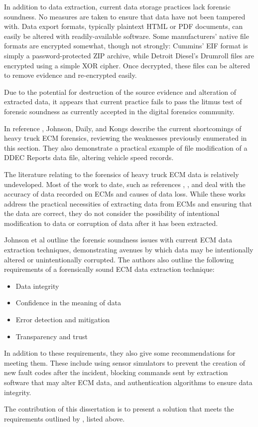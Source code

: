 In addition to data extraction, current data storage practices lack forensic soundness. No measures are taken to ensure that data have not been tampered
with. Data export formats, typically plaintext HTML or PDF documents, can easily be altered with readily-available software. Some manufacturers' native file formats are encrypted
somewhat, though not strongly: Cummins' EIF format is simply a password-protected ZIP archive, while Detroit Diesel's Drumroll files are encrypted using a simple XOR cipher.
Once decrypted, these files can be altered to remove evidence and re-encrypted easily\cite{Johnson2014}.

Due to the potential for destruction of the source evidence and alteration of extracted data, it appears that current practice fails to pass the litmus test of forensic soundness
as currently accepted in the digital forensics community.

In reference \cite{Johnson2014}, Johnson, Daily, and Kongs describe the current shortcomings of heavy truck ECM forensics, reviewing the weaknesses previously enumerated in this section. They also
demonstrate a practical example of file modification of a DDEC Reports data file, altering vehicle speed records.


The literature relating to the forensics of heavy truck ECM data is relatively undeveloped. Most of the work to date, such as references \cite{reust2004}, \cite{steiner2013}, and \cite{austin2011} deal
with the accuracy of data recorded on ECMs and causes of data loss. While these works address the practical necessities of extracting data from ECMs and ensuring that the data are
correct, they do not consider the possibility of intentional modification to data or corruption of data after it has been extracted.

Johnson et al \cite{Johnson2014} outline the forensic soundness issues with current ECM data extraction techniques, demonstrating avenues by which data may be intentionally altered or unintentionally corrupted. The authors also outline the following requirements of a forensically sound ECM data extraction technique:

\begin{itemize}
  \item Data integrity
  \item Confidence in the meaning of data
  \item Error detection and mitigation
  \item Transparency and trust
\end{itemize}

In addition to these requirements, they also give some recommendations for meeting them. These include using sensor simulators to prevent the creation of new fault codes
after the incident, blocking commands sent by extraction software that may alter ECM data, and authentication algorithms to ensure data integrity.

The contribution of this dissertation is to present a solution that meets the requirements outlined by \cite{Johnson2014}, listed above.
